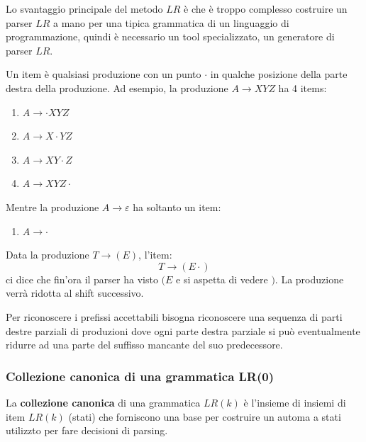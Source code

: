 \documentclass[a4paper]{article}
\begin{document}
Lo svantaggio principale del metodo \( LR \) è che è troppo complesso costruire un
parser \( LR \) a mano per una tipica grammatica di un linguaggio di programmazione, quindi
è necessario un tool specializzato, un generatore di parser \( LR \).

\begin{definition}[Item]
  Un item è qualsiasi produzione con un punto \( \cdot \) in qualche posizione della
parte destra della produzione. Ad esempio, la produzione \( A \to XYZ \) ha 4 items:
\begin{enumerate}
  \item \( A \to \cdot XYZ \)
  \item \( A \to X \cdot YZ \)
  \item \( A \to XY \cdot Z \)
  \item \( A \to XYZ \cdot \)
\end{enumerate}
Mentre la produzione \( A \to \varepsilon \) ha soltanto un item:
\begin{enumerate}
  \item \( A \to \cdot \)
\end{enumerate}
\end{definition}

\begin{example}
  Data la produzione \( T \to (E) \), l'item:
  \[
    T \to (E \cdot )
  \] 
  ci dice che fin'ora il parser ha visto \( (E \) e si aspetta di vedere \( ) \).
  La produzione verrà ridotta al shift successivo.
\end{example}

\vspace{1em}
\noindent
Per riconoscere i prefissi accettabili bisogna riconoscere una sequenza di
parti destre parziali di produzioni dove ogni parte destra parziale si può eventualmente
ridurre ad una parte del suffisso mancante del suo predecessore.

\subsubsection{Collezione canonica di una grammatica LR(0)}
\begin{definition}
  La \textbf{collezione canonica} di una grammatica \( LR(k) \) è l'insieme di insiemi
  di item \( LR(k) \) (stati) che forniscono una base per costruire un automa a stati
  utilizzto per fare decisioni di parsing.
\end{definition}
\end{document}
